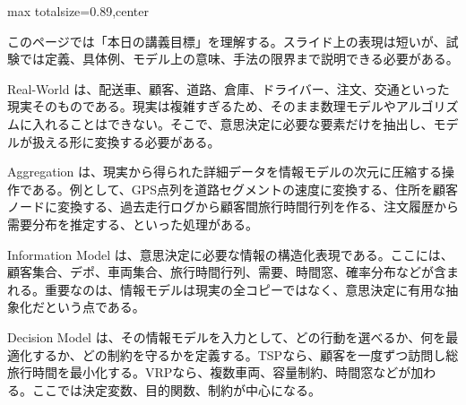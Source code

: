 \begin{minipage}[t]{0.58\textwidth}
\begin{adjustbox}{max totalsize={\textwidth}{0.89\textheight},center}
\begin{minipage}{\textwidth}\scriptsize
{}このページでは「本日の講義目標」を理解する。スライド上の表現は短いが、試験では定義、具体例、モデル上の意味、手法の限界まで説明できる必要がある。\par
Real-World は、配送車、顧客、道路、倉庫、ドライバー、注文、交通といった現実そのものである。現実は複雑すぎるため、そのまま数理モデルやアルゴリズムに入れることはできない。そこで、意思決定に必要な要素だけを抽出し、モデルが扱える形に変換する必要がある。\par
Aggregation は、現実から得られた詳細データを情報モデルの次元に圧縮する操作である。例として、GPS点列を道路セグメントの速度に変換する、住所を顧客ノードに変換する、過去走行ログから顧客間旅行時間行列を作る、注文履歴から需要分布を推定する、といった処理がある。\par
Information Model は、意思決定に必要な情報の構造化表現である。ここには、顧客集合、デポ、車両集合、旅行時間行列、需要、時間窓、確率分布などが含まれる。重要なのは、情報モデルは現実の全コピーではなく、意思決定に有用な抽象化だという点である。\par
Decision Model は、その情報モデルを入力として、どの行動を選べるか、何を最適化するか、どの制約を守るかを定義する。TSPなら、顧客を一度ずつ訪問し総旅行時間を最小化する。VRPなら、複数車両、容量制約、時間窓などが加わる。ここでは決定変数、目的関数、制約が中心になる。\par

\end{minipage}
\end{adjustbox}
\end{minipage}
